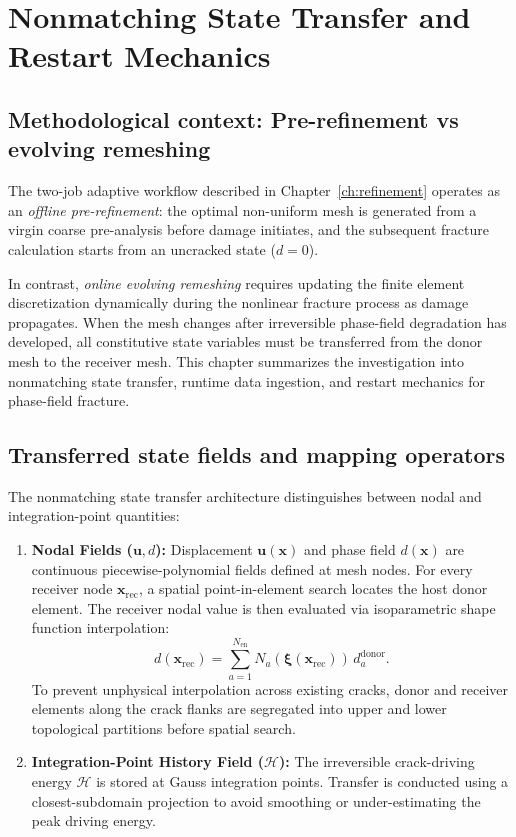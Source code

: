 \chapter{Nonmatching State Transfer and Restart Mechanics}
\label{ch:transfer}

\section{Methodological context: Pre-refinement vs evolving remeshing}
The two-job adaptive workflow described in Chapter~\ref{ch:refinement} operates as an \emph{offline pre-refinement}: the optimal non-uniform mesh is generated from a virgin coarse pre-analysis before damage initiates, and the subsequent fracture calculation starts from an uncracked state ($d = 0$).

In contrast, \emph{online evolving remeshing} requires updating the finite element discretization dynamically during the nonlinear fracture process as damage propagates. When the mesh changes after irreversible phase-field degradation has developed, all constitutive state variables must be transferred from the donor mesh to the receiver mesh. This chapter summarizes the investigation into nonmatching state transfer, runtime data ingestion, and restart mechanics for phase-field fracture.

\section{Transferred state fields and mapping operators}
The nonmatching state transfer architecture distinguishes between nodal and integration-point quantities:
\begin{enumerate}
  \item \textbf{Nodal Fields ($\mathbf{u}, d$):} Displacement $\mathbf{u}(\mathbf{x})$ and phase field $d(\mathbf{x})$ are continuous piecewise-polynomial fields defined at mesh nodes. For every receiver node $\mathbf{x}_{\mathrm{rec}}$, a spatial point-in-element search locates the host donor element. The receiver nodal value is then evaluated via isoparametric shape function interpolation:
  \begin{equation}
  d(\mathbf{x}_{\mathrm{rec}}) = \sum_{a=1}^{N_{\mathrm{en}}} N_a(\boldsymbol\xi(\mathbf{x}_{\mathrm{rec}}))\,d_a^{\mathrm{donor}}.
  \end{equation}
  To prevent unphysical interpolation across existing cracks, donor and receiver elements along the crack flanks are segregated into upper and lower topological partitions before spatial search.
  \item \textbf{Integration-Point History Field ($\mathcal{H}$):} The irreversible crack-driving energy $\mathcal{H}$ is stored at Gauss integration points. Transfer is conducted using a closest-subdomain projection to avoid smoothing or under-estimating the peak driving energy.
\end{enumerate}

